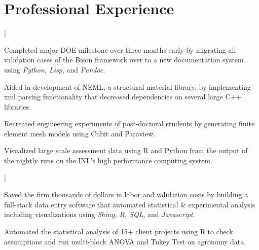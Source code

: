 \message{ !name(cv_12 copy.tex)}\documentclass[letterpaper]{deedy-resume}
\begin{document}
\begin{minipage}[t]{0.65\textwidth} 
\section{Professional Experience}

 |
\vspace{\topsep} 
\begin{tightitemize}
\item Completed major DOE milestone over three months early by migrating all validation cases of the Bison framework over to a new documentation system using \textit{Python, Lisp}, and \textit{Pandoc}. \\
\item Aided in development of NEML, a structural material library, by implementing xml parsing functionality that decreased dependencies on several large C++ libraries.\\
\item Recreated engineering experiments of post-doctoral students by generating finite element mesh models using Cubit and Paraview. \\ 
\item Visualized large scale assessment data using R and Python from the output of the nightly runs on the INL's high performance computing system. \\
\end{tightitemize}

\sectionspace 

 |
\begin{tightitemize}
  \item Saved the firm thousands of dollars in labor and validation costs by building a full-stack data entry software that automated statistical \& experimental analysis including visualizations using \textit{Shiny, R, SQL}, and \textit{Javascript}. \\
  \item Automated the statistical analysis of 15+ client projects using R to check assumptions and run multi-block ANOVA and Tukey Test on agronomy data.  \\
\end{tightitemize}

\sectionspace 


\end{minipage}
\end{document}

